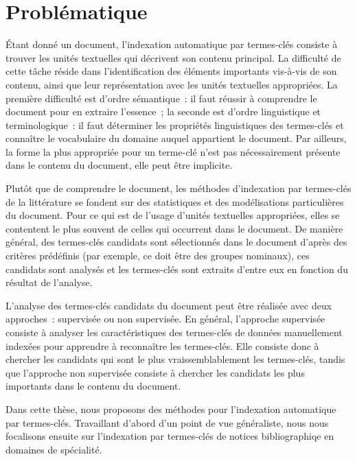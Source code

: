 
  \section{Problématique}
  \label{sec:main-introduction-problem_statement}
    Étant donné un document, l'indexation automatique par termes-clés consiste à
    trouver les unités textuelles qui décrivent son contenu principal. La
    difficulté de cette tâche réside dans l'identification des éléments
    importants vis-à-vis de son contenu, ainsi que leur représentation avec les
    unités textuelles appropriées. La première difficulté est d'ordre
    sémantique~: il faut réussir à comprendre le document pour en extraire
    l'essence~; la seconde est d'ordre linguistique et terminologique~: il faut
    déterminer les propriétés linguistiques des termes-clés et connaître le
    vocabulaire du domaine auquel appartient le document. Par ailleurs, la forme
    la plus appropriée pour un terme-clé n'est pas nécessairement présente dans
    le contenu du document, elle peut être implicite.

    Plutôt que de comprendre le document, les méthodes d'indexation par
    termes-clés de la littérature se fondent sur des statistiques et
    des modélisations particulières du document. Pour ce qui est de l'usage
    d'unités textuelles appropriées, elles se contentent le plus souvent de
    celles qui occurrent dans le document. De manière général, des
    termes-clés candidats sont sélectionnés dans le document d'après des
    critères prédéfinis (par exemple, ce doit être des groupes nominaux), ces
    candidats sont analysés et les termes-clés sont extraits d'entre eux en
    fonction du résultat de l'analyse.

    L'analyse des termes-clés candidats du document peut être réalisée avec deux
    approches~: supervisée ou non supervisée. En général, l'approche supervisée
    consiste à analyser les caractéristiques des termes-clés de données
    manuellement indexées pour apprendre à reconnaître les termes-clés. Elle
    consiste donc à chercher les candidats qui sont le plus vraissemblablement
    les termes-clés, tandis que l'approche non supervisée consiste à chercher
    les candidats les plus importants dans le contenu du document.
    
    Dans cette thèse, nous proposons des méthodes pour l'indexation automatique
    par termes-clés. Travaillant d'abord d'un point de vue généraliste, nous
    nous focalisons ensuite sur l'indexation par termes-clés de notices
    bibliographiqe en domaines de spécialité.

